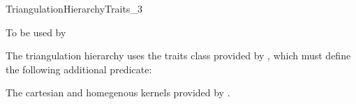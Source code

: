 

\begin{ccRefConcept}{TriangulationHierarchyTraits_3}


To be used by \protect {}

\ccDefinition

The triangulation hierarchy uses the traits class
 provided by , which must define the
following additional predicate: 


\ccHasModels

The cartesian and homegenous kernels provided by \cgal.

\end{ccRefConcept}

